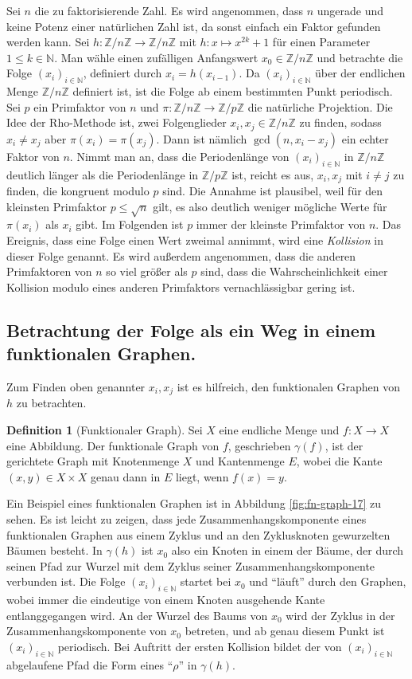 \documentclass[a4paper, 11pt, ngerman]{article}
\newcommand{\N}{\mathbb{N}}
\newcommand{\Z}{\mathbb{Z}}
\theoremstyle{definition}
\newtheorem{definition}{Definition}
\theoremstyle{plain}
\theoremstyle{remark}
\begin{document}
Sei $n$ die zu faktorisierende Zahl. Es wird angenommen, dass $n$ ungerade und keine Potenz einer natürlichen Zahl ist, da sonst einfach ein Faktor gefunden werden kann. Sei $h : \Z/n\Z \to \Z/n\Z$ mit $h : x \mapsto x^{2k} + 1$ für einen Parameter $1 \le k \in \N$. Man wähle einen zufälligen Anfangswert $x_0 \in \Z/n\Z$ und betrachte die Folge $(x_i)_{i \in \N}$, definiert durch $x_i = h(x_{i - 1})$. Da $(x_i)_{i \in \N}$ über der endlichen Menge $\Z/n\Z$ definiert ist, ist die Folge ab einem bestimmten Punkt periodisch. Sei $p$ ein Primfaktor von $n$ und $\pi : \Z/n\Z \to \Z/p\Z$ die natürliche Projektion. Die Idee der Rho-Methode ist, zwei Folgenglieder $x_i, x_j \in \Z/n\Z$ zu finden, sodass $x_i \ne x_j$ aber $\pi(x_i) = \pi(x_j)$. Dann ist nämlich $\gcd(n, x_i - x_j)$ ein echter Faktor von $n$. Nimmt man an, dass die Periodenlänge von $(x_i)_{i \in \N}$ in $\Z/n\Z$ deutlich länger als die Periodenlänge in $\Z/p\Z$ ist, reicht es aus, $x_i, x_j$ mit $i \ne j$ zu finden, die kongruent modulo $p$ sind. Die Annahme ist plausibel, weil für den kleinsten Primfaktor $p \le \sqrt n$ gilt, es also deutlich weniger mögliche Werte für $\pi(x_i)$ als $x_i$ gibt. Im Folgenden ist $p$ immer der kleinste Primfaktor von $n$. Das Ereignis, dass eine Folge einen Wert zweimal annimmt, wird eine \emph{Kollision} in dieser Folge genannt. Es wird außerdem angenommen, dass die anderen Primfaktoren von $n$ so viel größer als $p$ sind, dass die Wahrscheinlichkeit einer Kollision modulo eines anderen Primfaktors vernachlässigbar gering ist.

\subsection{Betrachtung der Folge als ein Weg in einem funktionalen Graphen.}

Zum Finden oben genannter $x_i, x_j$ ist es hilfreich, den funktionalen Graphen von $h$ zu betrachten.

\begin{definition}[Funktionaler Graph]
    Sei $X$ eine endliche Menge und $f: X \to X$ eine Abbildung. Der funktionale Graph von $f$, geschrieben $\gamma(f)$, ist der gerichtete Graph mit Knotenmenge $X$ und Kantenmenge $E$, wobei die Kante $(x, y) \in X \times X$ genau dann in $E$ liegt, wenn $f(x) = y$.
\end{definition}

Ein Beispiel eines funktionalen Graphen ist in Abbildung \ref{fig:fn-graph-17} zu sehen. Es ist leicht zu zeigen, dass jede Zusammenhangskomponente eines funktionalen Graphen aus einem Zyklus und an den Zyklusknoten gewurzelten Bäumen besteht. In $\gamma(h)$ ist $x_0$ also ein Knoten in einem der Bäume, der durch seinen Pfad zur Wurzel mit dem Zyklus seiner Zusammenhangskomponente verbunden ist. Die Folge $(x_i)_{i \in \N}$ startet bei $x_0$ und "`läuft"' durch den Graphen, wobei immer die eindeutige von einem Knoten ausgehende Kante entlanggegangen wird. An der Wurzel des Baums von $x_0$ wird der Zyklus in der Zusammenhangskomponente von $x_0$ betreten, und ab genau diesem Punkt ist $(x_i)_{i \in \N}$ periodisch. Bei Auftritt der ersten Kollision bildet der von $(x_i)_{i \in \N}$ abgelaufene Pfad die Form eines "`$\rho$"' in $\gamma(h)$.
\end{document}
